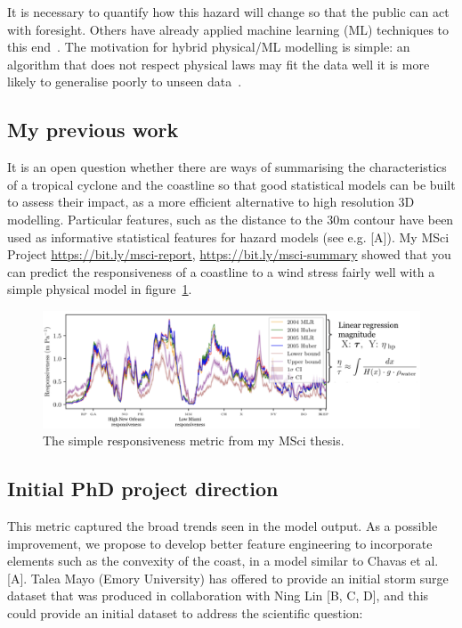 \documentclass[usenames, dvipsnames]{article}      %
\begin{document}
It is necessary to quantify how this hazard will change
so that the public can act with foresight.
Others have already applied machine learning (ML) techniques to this
end~\cite{kulp2019new, kulp2018coastaldem, tadesse2020data}.
The motivation for hybrid physical/ML modelling is simple:
an algorithm that does not respect physical laws
may fit the data well
it is more likely to generalise poorly to unseen data~\cite{beucler2019achieving}.

\subsection*{My previous work}

It is an open question whether there are ways of summarising the characteristics of a tropical cyclone and the coastline so that good statistical models can be built to assess their impact, as a more efficient alternative to high resolution 3D modelling. Particular features, such as the distance to the 30m contour have been used as informative statistical features for hazard models (see e.g. [A]). My MSci Project \url{https://bit.ly/msci-report}, \url{https://bit.ly/msci-summary} showed that you can predict the responsiveness of a coastline to a wind stress fairly well with a simple physical model in figure~\ref{fig:responsiveness}.

\begin{figure}
    \centering
    \includegraphics[width=1.1\linewidth]{img.png}
    \caption{The simple responsiveness metric from my MSci thesis.}
    \label{fig:responsiveness}
\end{figure}

\subsection*{Initial PhD project direction}

This metric captured the broad trends seen in the model output. As a possible improvement, we propose to develop better feature engineering to incorporate elements such as the convexity of the coast, in a model similar to Chavas et al. [A]. Talea Mayo (Emory University) has offered to provide an initial storm surge dataset that was produced in collaboration with Ning Lin [B, C, D], and this could provide an initial dataset to address the scientific question:
\end{document}
